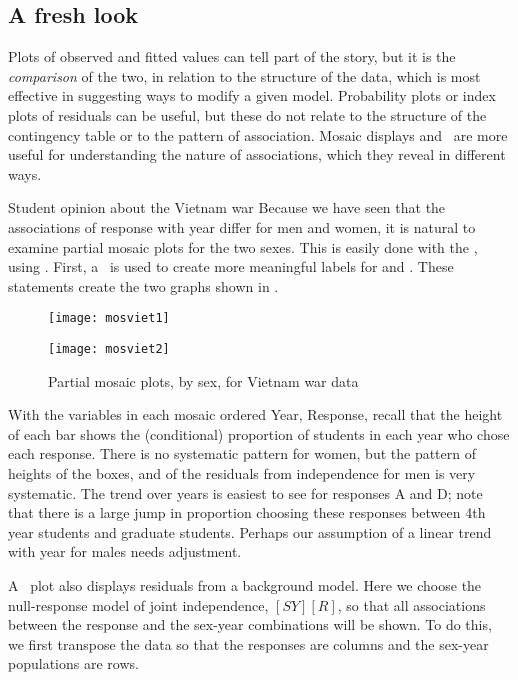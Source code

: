 \subsection{A fresh look}
Plots of observed and fitted values can tell part of the story,
but it is the \emph{comparison} of the two, in relation to the structure of
the data, which is most effective in suggesting ways to modify a
given model.  Probability plots or index plots of residuals can be useful,
but these do not relate to the structure of the contingency table
or to the pattern of association.
Mosaic displays and \CA\ are more useful for understanding the nature of associations,
which they reveal in different ways.

\begin{Example}[vietnam2]{Student opinion about the Vietnam war}
Because we have seen that the associations of response with year
differ for men and women, it is natural to examine partial mosaic
plots for the two sexes.
This is easily done with the , using .
First, a \Dstp\ is used to create more meaningful labels for
 and . These statements create the two
graphs shown in .


\begin{figure}[htb]
 \begin{minipage}[t]{.49\linewidth}
  \texttt{[image: mosviet1]}
 \end{minipage}%
 \hfill
 \begin{minipage}[t]{.49\linewidth}
  \texttt{[image: mosviet2]}
 \end{minipage}
 \caption{Partial mosaic plots, by sex, for Vietnam war data}\label{fig:mosviet}
\end{figure}
With the variables in each mosaic ordered Year, Response,
recall that the height of each bar shows the (conditional) proportion
of students in each year who chose each response. There is no systematic
pattern for women, but the pattern of heights of the boxes, and of the
residuals from independence for men is very systematic.
The trend over years is easiest to see for responses A and D;
note that there is a large jump in proportion choosing these responses
between 4th year students and graduate students.
Perhaps our assumption of a linear trend with year for males needs
adjustment.

A \CA\ plot also displays residuals from a background model.  Here
we choose the null-response model of joint independence, $[SY] [R]$, so that all associations
between the response and the sex-year combinations will be shown.
To do this, we first transpose the data so that the responses
are columns and the sex-year populations are rows.
\begin{listing}


\end{listing}
\end{Example}
